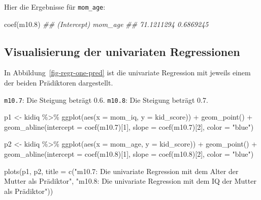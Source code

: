 \documentclass[
  a4paper,
  DIV=11]{scrreprt}
\newenvironment{Shaded}{\begin{snugshade}}{\end{snugshade}}
\newcommand{\AttributeTok}[1]{\textcolor[rgb]{0.40,0.45,0.13}{#1}}
\newcommand{\DecValTok}[1]{\textcolor[rgb]{0.68,0.00,0.00}{#1}}
\newcommand{\DocumentationTok}[1]{\textcolor[rgb]{0.37,0.37,0.37}{\textit{#1}}}
\newcommand{\FloatTok}[1]{\textcolor[rgb]{0.68,0.00,0.00}{#1}}
\newcommand{\FunctionTok}[1]{\textcolor[rgb]{0.28,0.35,0.67}{#1}}
\newcommand{\NormalTok}[1]{\textcolor[rgb]{0.00,0.23,0.31}{#1}}
\newcommand{\OtherTok}[1]{\textcolor[rgb]{0.00,0.23,0.31}{#1}}
\newcommand{\SpecialCharTok}[1]{\textcolor[rgb]{0.37,0.37,0.37}{#1}}
\newcommand{\StringTok}[1]{\textcolor[rgb]{0.13,0.47,0.30}{#1}}
\theoremstyle{definition}
\theoremstyle{remark}
\begin{document}
Hier die Ergebnisse für \texttt{mom\_age}:

\begin{Shaded}
\begin{Highlighting}[]
\FunctionTok{coef}\NormalTok{(m10}\FloatTok{.8}\NormalTok{)}
\DocumentationTok{\#\# (Intercept)     mom\_age }
\DocumentationTok{\#\#  71.1211294   0.6869245}
\end{Highlighting}
\end{Shaded}

\hypertarget{visualisierung-der-univariaten-regressionen}{%
\subsection{Visualisierung der univariaten
Regressionen}\label{visualisierung-der-univariaten-regressionen}}

In Abbildung~\ref{fig-regr-one-pred} ist die univariate Regression mit
jeweils einem der beiden Prädiktoren dargestellt.

\texttt{m10.7}: Die Steigung beträgt 0.6. \texttt{m10.8}: Die Steigung
beträgt 0.7.

\begin{Shaded}
\begin{Highlighting}[]
\NormalTok{p1 }\OtherTok{\textless{}{-}} 
\NormalTok{  kidiq }\SpecialCharTok{\%\textgreater{}\%} 
  \FunctionTok{ggplot}\NormalTok{(}\FunctionTok{aes}\NormalTok{(}\AttributeTok{x =}\NormalTok{ mom\_iq, }\AttributeTok{y =}\NormalTok{ kid\_score)) }\SpecialCharTok{+}
  \FunctionTok{geom\_point}\NormalTok{() }\SpecialCharTok{+}
  \FunctionTok{geom\_abline}\NormalTok{(}\AttributeTok{intercept =} \FunctionTok{coef}\NormalTok{(m10}\FloatTok{.7}\NormalTok{)[}\DecValTok{1}\NormalTok{],}
              \AttributeTok{slope =} \FunctionTok{coef}\NormalTok{(m10}\FloatTok{.7}\NormalTok{)[}\DecValTok{2}\NormalTok{],}
              \AttributeTok{color =} \StringTok{"blue"}\NormalTok{) }

\NormalTok{p2 }\OtherTok{\textless{}{-}} 
\NormalTok{kidiq }\SpecialCharTok{\%\textgreater{}\%} 
  \FunctionTok{ggplot}\NormalTok{(}\FunctionTok{aes}\NormalTok{(}\AttributeTok{x =}\NormalTok{ mom\_age, }\AttributeTok{y =}\NormalTok{ kid\_score)) }\SpecialCharTok{+}
  \FunctionTok{geom\_point}\NormalTok{() }\SpecialCharTok{+}
  \FunctionTok{geom\_abline}\NormalTok{(}\AttributeTok{intercept =} \FunctionTok{coef}\NormalTok{(m10}\FloatTok{.8}\NormalTok{)[}\DecValTok{1}\NormalTok{],}
              \AttributeTok{slope =} \FunctionTok{coef}\NormalTok{(m10}\FloatTok{.8}\NormalTok{)[}\DecValTok{2}\NormalTok{],}
              \AttributeTok{color =} \StringTok{"blue"}\NormalTok{)}

\FunctionTok{plots}\NormalTok{(p1, p2,}
      \AttributeTok{title =} \FunctionTok{c}\NormalTok{(}\StringTok{"m10.7: Die univariate Regression mit dem Alter der Mutter als Prädiktor"}\NormalTok{,}
        \StringTok{"m10.8: Die univariate Regression mit dem IQ der Mutter als Prädiktor"}\NormalTok{))}
\end{Highlighting}
\end{Shaded}
\end{document}
